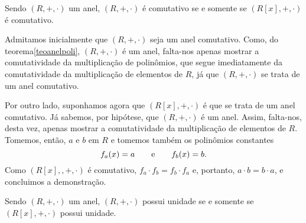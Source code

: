 \begin{Propr}\label{proprpolicomutativo}
  Sendo $(R,+,\cdot)$ um anel, $(R,+,\cdot)$ é comutativo se e somente
  se $(R[x],+,\cdot)$ é comutativo.
\end{Propr}

\begin{dem}
  Admitamos inicialmente que $(R,+,\cdot)$ seja um anel
  comutativo. Como, do teorema\xspace\ref{teoanelpoli}, $(R,+,\cdot)$ é
  um anel, falta-nos apenas mostrar a comutatividade da multiplicação de
  polinômios, que segue imediatamente da comutatividade da multiplicação
  de elementos de $R$, já que $(R,+,\cdot)$ se trata de um anel
  comutativo.

  Por outro lado, suponhamos agora que $(R[x],+,\cdot)$ é que se trata
  de um anel comutativo. Já sabemos, por hipótese, que $(R,+,\cdot)$ é
  um anel. Assim, falta-nos, desta vez, apenas mostrar a comutatividade
  da multiplicação de elementos de $R$. Tomemos, então, $a$ e $b$ em
  $R$ e tomemos também os polinômios constantes
  \begin{equation*}
    f_a(x) = a\qquad\text{e}\qquad f_b(x) = b\mathrm{.}
  \end{equation*}
  Como $(R[x],,+,\cdot)$ é comutativo, $f_a\cdot f_b = f_b\cdot f_a$ e,
  portanto, $a\cdot b = b\cdot a$, e concluimos a demonstração.
\end{dem}

\begin{Propr}\label{proprpoliunidade}
  Sendo $(R,+,\cdot)$ um anel, $(R,+,\cdot)$ possui unidade se e somente
  se $(R[x],+,\cdot)$ possui unidade.
\end{Propr}

